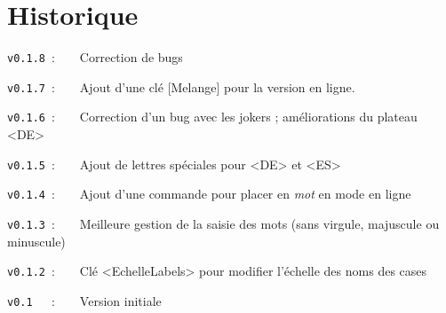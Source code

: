 \documentclass{article}
\begin{document}
\begin{PresentationCode}{}
{\Huge {}}

{\Huge {}}
\end{PresentationCode}

\newpage

\part*{Historique}

\verb|v0.1.8|~:~~~~Correction de bugs

\verb|v0.1.7|~:~~~~Ajout d'une clé \textsf{[Melange]} pour la version en ligne.

\verb|v0.1.6|~:~~~~Correction d'un bug avec les jokers ; améliorations du plateau \textsf{<DE>}

\verb|v0.1.5|~:~~~~Ajout de lettres spéciales pour \textsf{<DE>} et \textsf{<ES>}

\verb|v0.1.4|~:~~~~Ajout d'une commande pour placer en \textit{mot} en mode \og en ligne \fg

\verb|v0.1.3|~:~~~~Meilleure gestion de la saisie des mots (sans virgule, majuscule ou minuscule)

\verb|v0.1.2|~:~~~~Clé \textsf{<EchelleLabels>} pour modifier l'échelle des noms des cases

\verb|v0.1  |~:~~~~Version initiale
\end{document}
